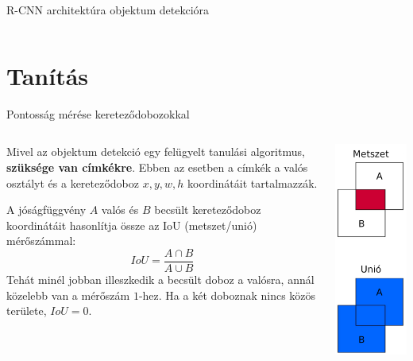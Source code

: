\documentclass[english, aspectratio=169]{beamer}
\makeatletter
\let\origtableofcontents=\tableofcontents
\def\tableofcontents{\@ifnextchar[{\origtableofcontents}{\gobbletableofcontents}}
\def\gobbletableofcontents#1{\origtableofcontents}
\makeatother
\begin{document}
\begin{frame}{R-CNN architektúra objektum detekcióra}
\begin{columns}
\begin{column}{.6\textwidth}
\begin{center}
				\end{center}
			\end{column}
		\end{columns}
	\end{frame}
	
	\section{Tanítás}
	
	\begin{frame}
		\tableofcontents[currentsection]
	\end{frame}
	
	\begin{frame}{Pontosság mérése kereteződobozokkal}
		\begin{columns}
			\begin{column}{.7\textwidth}
				Mivel az objektum detekció egy felügyelt tanulási algoritmus, \textbf{szüksége van címkékre}. Ebben az esetben a címkék a valós osztályt és a kereteződoboz $x,y,w,h$ koordinátáit tartalmazzák.\par\smallskip
				A jóságfüggvény $A$ valós és $B$ becsült kereteződoboz koordinátáit hasonlítja össze az IoU (metszet/unió) mérőszámmal:
				\[
				IoU=\frac{A \cap B}{A \cup B}
				\]
				Tehát minél jobban illeszkedik a becsült doboz a valósra, annál közelebb van a mérőszám $1$-hez. Ha a két doboznak nincs közös területe, $IoU=0$.
			\end{column}
			\begin{column}{.3\textwidth}
				\begin{center}
					\includegraphics[height=7cm, width=7cm, keepaspectratio]{images/od_9.png}
				\end{center}
			\end{column}
		\end{columns}
	\end{frame}
	
\end{document}

